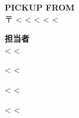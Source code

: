 \parbox[t]{.50\textwidth}{
\textbf{PICKUP FROM} \\
〒 <%
<%
<%
<%
<%
}
\parbox[t]{.38\textwidth}{
\textbf{担当者} \\
<%
<%

<%
<%

<%
<%

<%
<%
}